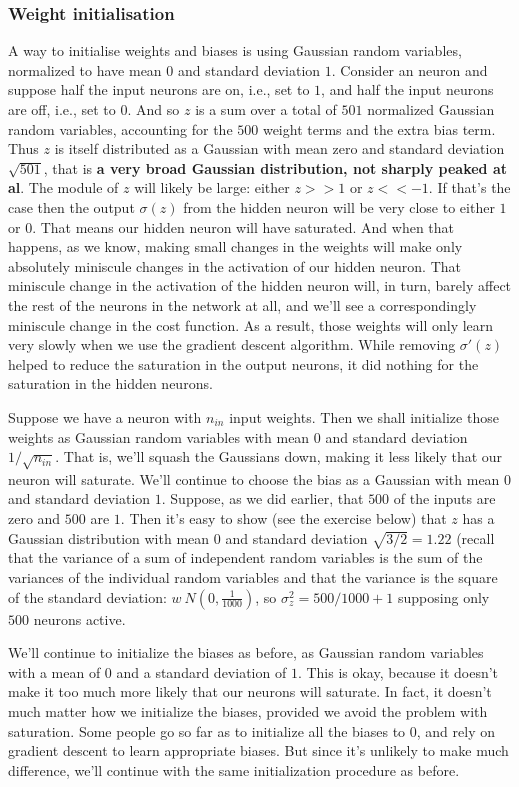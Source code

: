 \documentclass[12pt, letterpaper]{article}
\theoremstyle{definition}
\let\tb\textbf
\begin{document}
\subsubsection{Weight initialisation}
A way to initialise weights and biases is using Gaussian random variables, normalized to have mean $0$ and standard deviation $1$. Consider an neuron and suppose  half the input neurons are on, i.e., set to $1$, and half the input neurons are off, i.e., set to $0$. And so $z$ is a sum over a total of $501$ normalized Gaussian random variables, accounting for the $500$ weight terms and the extra bias term. Thus $z$ is itself distributed as a Gaussian with mean zero and standard deviation $\sqrt{501}$, that is \tb{a very broad Gaussian distribution, not sharply peaked at al}. The module of $z$ will likely be large: either $z>>1$ or $z<<-1$. If that's the case then the output $\sigma(z)$ from the hidden neuron will be very close to either $1$ or $0$. That means our hidden neuron will have saturated.  And when that happens, as we know, making small changes in the weights will make only absolutely miniscule changes in the activation of our hidden neuron. That miniscule change in the activation of the hidden neuron will, in turn, barely affect the rest of the neurons in the network at all, and we'll see a correspondingly miniscule change in the cost function. As a result, those weights will only learn very slowly when we use the gradient descent algorithm. While removing $\sigma'(z)$ helped to reduce the saturation in the output neurons, it did nothing for the saturation in the hidden neurons.
 
Suppose we have a neuron with $n_{in}$ input weights. Then we shall initialize those weights as Gaussian random variables with mean $0$ and standard deviation $1/\sqrt{n_{in}}$. That is, we'll squash the Gaussians down, making it less likely that our neuron will saturate. We'll continue to choose the bias as a Gaussian with mean $0$ and standard deviation $1$. Suppose, as we did earlier, that $500$ of the inputs are zero and $500$ are $1$. Then it's easy to show (see the exercise below) that $z$ has a Gaussian distribution with mean $0$ and standard deviation $\sqrt{3/2}=1.22$ (recall that the variance of a sum of independent random variables is the sum of the variances of the individual random variables and that the variance is the square of the standard deviation: $w~ N(0, \frac{1}{1000})$, so $\sigma_z^2 = 500/1000 + 1$ supposing only $500$ neurons active.

We'll continue to initialize the biases as before, as Gaussian random variables with a mean of $0$ and a standard deviation of $1$. This is okay, because it doesn't make it too much more likely that our neurons will saturate. In fact, it doesn't much matter how we initialize the biases, provided we avoid the problem with saturation. Some people go so far as to initialize all the biases to $0$, and rely on gradient descent to learn appropriate biases. But since it's unlikely to make much difference, we'll continue with the same initialization procedure as before.
\end{document}
